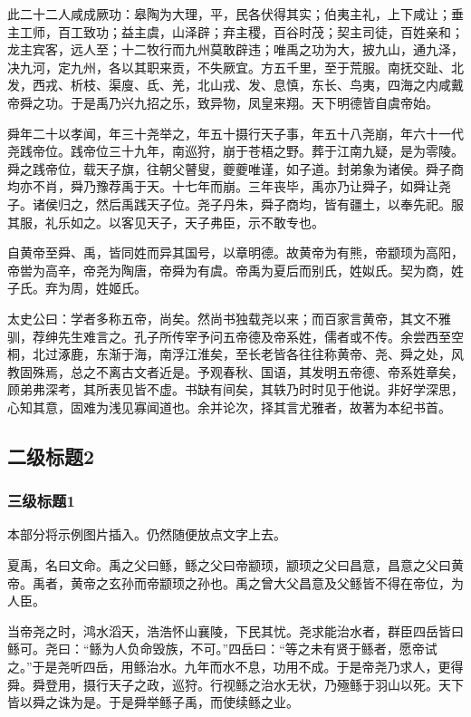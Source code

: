 \documentclass[UTF8,12pt,AutoFakeBold]{ctexart}
\begin{document}
此二十二人咸成厥功：皋陶为大理，平，民各伏得其实；伯夷主礼，上下咸让；垂主工师，百工致功；益主虞，山泽辟；弃主稷，百谷时茂；契主司徒，百姓亲和；龙主宾客，远人至；十二牧行而九州莫敢辟违；唯禹之功为大，披九山，通九泽，决九河，定九州，各以其职来贡，不失厥宜。方五千里，至于荒服。南抚交趾、北发，西戎、析枝、渠廋、氐、羌，北山戎、发、息慎，东长、鸟夷，四海之内咸戴帝舜之功。于是禹乃兴九招之乐，致异物，凤皇来翔。天下明德皆自虞帝始。
\par
舜年二十以孝闻，年三十尧举之，年五十摄行天子事，年五十八尧崩，年六十一代尧践帝位。践帝位三十九年，南巡狩，崩于苍梧之野。葬于江南九疑，是为零陵。舜之践帝位，载天子旗，往朝父瞽叟，夔夔唯谨，如子道。封弟象为诸侯。舜子商均亦不肖，舜乃豫荐禹于天。十七年而崩。三年丧毕，禹亦乃让舜子，如舜让尧子。诸侯归之，然后禹践天子位。尧子丹朱，舜子商均，皆有疆土，以奉先祀。服其服，礼乐如之\cite{PhysRevLett.43.1365}。以客见天子，天子弗臣，示不敢专也。
\par
自黄帝至舜、禹，皆同姓而异其国号，以章明德。故黄帝为有熊，帝颛顼为高阳，帝喾为高辛，帝尧为陶唐，帝舜为有虞。帝禹为夏后而别氏，姓姒氏。契为商，姓子氏。弃为周，姓姬氏。
\par
太史公曰：学者多称五帝，尚矣。然尚书独载尧以来；而百家言黄帝，其文不雅驯，荐绅先生难言之。孔子所传宰予问五帝德及帝系姓，儒者或不传。余尝西至空桐，北过涿鹿，东渐于海，南浮江淮矣，至长老皆各往往称黄帝、尧、舜之处，风教固殊焉，总之不离古文者近是。予观春秋、国语，其发明五帝德、帝系姓章矣，顾弟弗深考，其所表见皆不虚。书缺有间矣，其轶乃时时见于他说。非好学深思，心知其意，固难为浅见寡闻道也。余并论次，择其言尤雅者，故著为本纪书首。





\subsection{二级标题2\label{章节：二级标题2}}

\subsubsection{三级标题1\label{章节：三级标题1}}

本部分将示例图片插入。仍然随便放点文字上去。

夏禹，名曰文命。禹之父曰鲧，鲧之父曰帝颛顼，颛顼之父曰昌意，昌意之父曰黄帝。禹者，黄帝之玄孙而帝颛顼之孙也。禹之曾大父昌意及父鲧皆不得在帝位，为人臣。

当帝尧之时，鸿水滔天，浩浩怀山襄陵，下民其忧。尧求能治水者，群臣四岳皆曰鲧可。尧曰：“鲧为人负命毁族，不可。”四岳曰：“等之未有贤于鲧者，愿帝试之。”于是尧听四岳，用鲧治水。九年而水不息，功用不成。于是帝尧乃求人，更得舜。舜登用，摄行天子之政，巡狩。行视鲧之治水无状，乃殛鲧于羽山以死。天下皆以舜之诛为是。于是舜举鲧子禹，而使续鲧之业。
\end{document}
